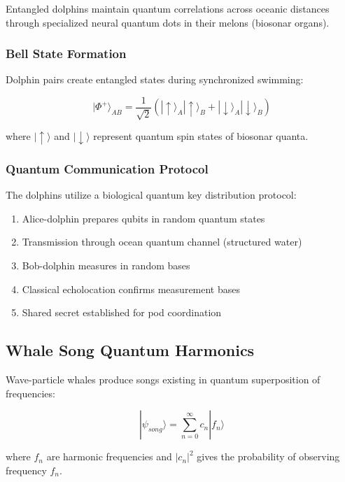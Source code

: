 \documentclass[11pt,a4paper]{article}
\begin{document}
Entangled dolphins maintain quantum correlations across oceanic distances through specialized neural quantum dots in their melons (biosonar organs).

\subsubsection{Bell State Formation}

Dolphin pairs create entangled states during synchronized swimming:

\begin{equation}
|\Phi^+\rangle_{AB} = \frac{1}{\sqrt{2}}(|\uparrow\rangle_A |\uparrow\rangle_B + |\downarrow\rangle_A |\downarrow\rangle_B)
\end{equation}

where $|\uparrow\rangle$ and $|\downarrow\rangle$ represent quantum spin states of biosonar quanta.

\subsubsection{Quantum Communication Protocol}

The dolphins utilize a biological quantum key distribution protocol:

\begin{enumerate}
    \item Alice-dolphin prepares qubits in random quantum states
    \item Transmission through ocean quantum channel (structured water)
    \item Bob-dolphin measures in random bases
    \item Classical echolocation confirms measurement bases
    \item Shared secret established for pod coordination
\end{enumerate}

\subsection{Whale Song Quantum Harmonics}

Wave-particle whales produce songs existing in quantum superposition of frequencies:

\begin{equation}
|\psi_{song}\rangle = \sum_{n=0}^{\infty} c_n |f_n\rangle
\end{equation}

where $f_n$ are harmonic frequencies and $|c_n|^2$ gives the probability of observing frequency $f_n$.
\end{document}
